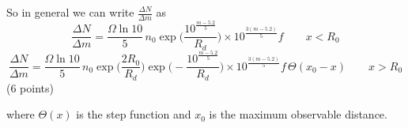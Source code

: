 \begin{description}
  So in general we can write $\frac{\Delta N}{\Delta m}$ as
  \[
    \frac{\Delta N}{\Delta m}
      = \frac{\Omega \ln 10}{5}\,n_0
        \exp\Big(\frac{10^{\frac{m-5.2}{5}}}{R_d}\Big)
        \times 10^{\frac{3(m-5.2)}{5}} f
    \qquad x < R_0
  \]
  \[
    \frac{\Delta N}{\Delta m}
      = \frac{\Omega \ln 10}{5}\,n_0
        \exp\Big(\frac{2R_0}{R_d}\Big)
        \exp\Big(-\frac{10^{\frac{m-5.2}{5}}}{R_d}\Big)
        \times 10^{\frac{3(m-5.2)}{5}} f\,\Theta(x_0 - x)
    \qquad x > R_0
  \]
  \hfill(6 points)

  where $\Theta(x)$ is the step function and $x_0$ is the maximum observable
  distance.
\end{description}

